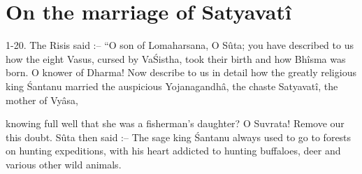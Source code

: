 ﻿\chapter{On the marriage of Satyavat\^i}

1-20. The Risis said :-- ``O son of Lomaharsana, O S\^uta; you have described to us how the eight Vasus, cursed by Va\'Sistha, took their birth and how Bh\^isma was born. O knower of Dharma! Now describe to us in detail how the greatly religious king \'Santanu married the auspicious Yojanagandh\^a, the chaste Satyavat\^i, the mother of Vy\^asa,

knowing full well that she was a fisherman's daughter? O Suvrata! Remove our this doubt. S\^uta then said :-- The sage king \'Santanu always used to go to forests on hunting expeditions, with his heart addicted to hunting buffaloes, deer and various other wild animals.

